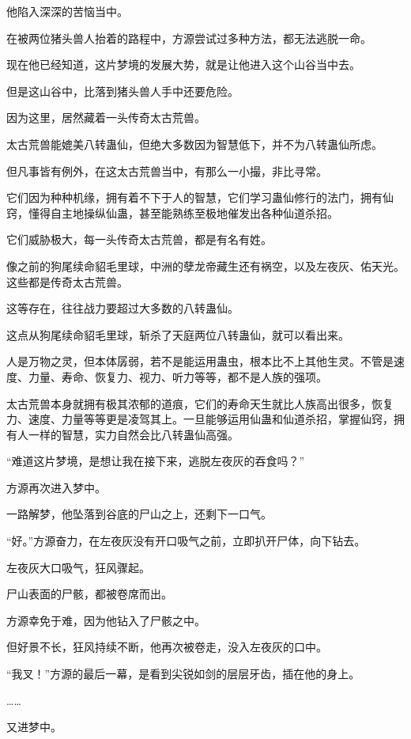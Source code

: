 \begin{this_body}
他陷入深深的苦恼当中。

在被两位猪头兽人抬着的路程中，方源尝试过多种方法，都无法逃脱一命。

现在他已经知道，这片梦境的发展大势，就是让他进入这个山谷当中去。

但是这山谷中，比落到猪头兽人手中还要危险。

因为这里，居然藏着一头传奇太古荒兽。

太古荒兽能媲美八转蛊仙，但绝大多数因为智慧低下，并不为八转蛊仙所虑。

但凡事皆有例外，在这太古荒兽当中，有那么一小撮，非比寻常。

它们因为种种机缘，拥有着不下于人的智慧，它们学习蛊仙修行的法门，拥有仙窍，懂得自主地操纵仙蛊，甚至能熟练至极地催发出各种仙道杀招。

它们威胁极大，每一头传奇太古荒兽，都是有名有姓。

像之前的狗尾续命貂毛里球，中洲的孽龙帝藏生还有祸空，以及左夜灰、佑天光。这些都是传奇太古荒兽。

这等存在，往往战力要超过大多数的八转蛊仙。

这点从狗尾续命貂毛里球，斩杀了天庭两位八转蛊仙，就可以看出来。

人是万物之灵，但本体孱弱，若不是能运用蛊虫，根本比不上其他生灵。不管是速度、力量、寿命、恢复力、视力、听力等等，都不是人族的强项。

太古荒兽本身就拥有极其浓郁的道痕，它们的寿命天生就比人族高出很多，恢复力、速度、力量等等更是凌驾其上。一旦能够运用仙蛊和仙道杀招，掌握仙窍，拥有人一样的智慧，实力自然会比八转蛊仙高强。

“难道这片梦境，是想让我在接下来，逃脱左夜灰的吞食吗？”

方源再次进入梦中。

一路解梦，他坠落到谷底的尸山之上，还剩下一口气。

“好。”方源奋力，在左夜灰没有开口吸气之前，立即扒开尸体，向下钻去。

左夜灰大口吸气，狂风骤起。

尸山表面的尸骸，都被卷席而出。

方源幸免于难，因为他钻入了尸骸之中。

但好景不长，狂风持续不断，他再次被卷走，没入左夜灰的口中。

“我叉！”方源的最后一幕，是看到尖锐如剑的层层牙齿，插在他的身上。

……

又进梦中。


\end{this_body}
